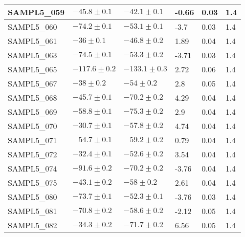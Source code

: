 \documentclass{article}
\begin{document}
\begin{table}[]
\begin{tabular}{|l|l|l|l|l|l|}
SAMPL5\_059 & $ -45.8 \pm 0.1 $               & $ -42.1 \pm 0.1 $                   & -0.66    & 0.03       & 1.4        \\ \hline
SAMPL5\_060 & $ -74.2 \pm 0.1 $               & $ -53.1 \pm 0.1 $                   & -3.7     & 0.03       & 1.4        \\ \hline
SAMPL5\_061 & $ -36 \pm 0.1 $                 & $ -46.8 \pm 0.2 $                   & 1.89     & 0.04       & 1.4        \\ \hline
SAMPL5\_063 & $ -74.5 \pm 0.1 $               & $ -53.3 \pm 0.2 $                   & -3.71    & 0.03       & 1.4        \\ \hline
SAMPL5\_065 & $ -117.6 \pm 0.2 $              & $ -133.1 \pm 0.3 $                  & 2.72     & 0.06       & 1.4        \\ \hline
SAMPL5\_067 & $ -38 \pm 0.2 $                 & $ -54 \pm 0.2 $                     & 2.8      & 0.05       & 1.4        \\ \hline
SAMPL5\_068 & $ -45.7 \pm 0.1 $               & $ -70.2 \pm 0.2 $                   & 4.29     & 0.04       & 1.4        \\ \hline
SAMPL5\_069 & $ -58.8 \pm 0.1 $               & $ -75.3 \pm 0.2 $                   & 2.9      & 0.04       & 1.4        \\ \hline
SAMPL5\_070 & $ -30.7 \pm 0.1 $               & $ -57.8 \pm 0.2 $                   & 4.74     & 0.04       & 1.4        \\ \hline
SAMPL5\_071 & $ -54.7 \pm 0.1 $               & $ -59.2 \pm 0.2 $                   & 0.79     & 0.04       & 1.4        \\ \hline
SAMPL5\_072 & $ -32.4 \pm 0.1 $               & $ -52.6 \pm 0.2 $                   & 3.54     & 0.04       & 1.4        \\ \hline
SAMPL5\_074 & $ -91.6 \pm 0.2 $               & $ -70.2 \pm 0.2 $                   & -3.76    & 0.04       & 1.4        \\ \hline
SAMPL5\_075 & $ -43.1 \pm 0.2 $               & $ -58 \pm 0.2 $                     & 2.61     & 0.04       & 1.4        \\ \hline
SAMPL5\_080 & $ -73.7 \pm 0.1 $               & $ -52.3 \pm 0.1 $                   & -3.76    & 0.03       & 1.4        \\ \hline
SAMPL5\_081 & $ -70.8 \pm 0.2 $               & $ -58.6 \pm 0.2 $                   & -2.12    & 0.05       & 1.4        \\ \hline
SAMPL5\_082 & $ -34.3 \pm 0.2 $               & $ -71.7 \pm 0.2 $                   & 6.56     & 0.05       & 1.4        \\ \hline

\end{tabular}
\end{table}
\end{document}

